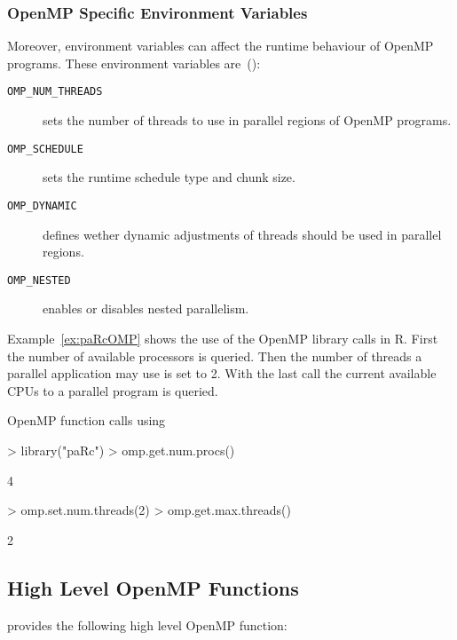 \subsubsection{OpenMP Specific Environment Variables}

Moreover, environment variables can affect the runtime behaviour of
OpenMP programs. These environment variables are~(\cite{openMP05}):

\begin{description}
\item[\texttt{OMP\_NUM\_THREADS}] sets the number of threads to use in
  parallel regions of OpenMP programs. 
\item[\texttt{OMP\_SCHEDULE}] sets the runtime schedule type and
  chunk size.
\item[\texttt{OMP\_DYNAMIC}] defines wether dynamic adjustments of threads
  should be used in parallel regions.
\item[\texttt{OMP\_NESTED}] enables or disables nested parallelism.
\end{description}

Example~\ref{ex:paRcOMP} shows the use of the OpenMP library calls in
R. First the number of available processors is queried. Then the
number of threads a parallel application may use is set to 2. With the
last call the current available CPUs to a parallel program is queried.

\begin{Example} OpenMP function calls using 
\label{ex:paRcOMP}
\begin{Schunk}
\begin{Sinput}
> library("paRc")
> omp.get.num.procs()
\end{Sinput}
\begin{Soutput}
[1] 4
\end{Soutput}
\begin{Sinput}
> omp.set.num.threads(2)
> omp.get.max.threads()
\end{Sinput}
\begin{Soutput}
[1] 2
\end{Soutput}
\end{Schunk}
\end{Example}

\subsection{High Level OpenMP Functions}

 provides the following high level OpenMP function: 

